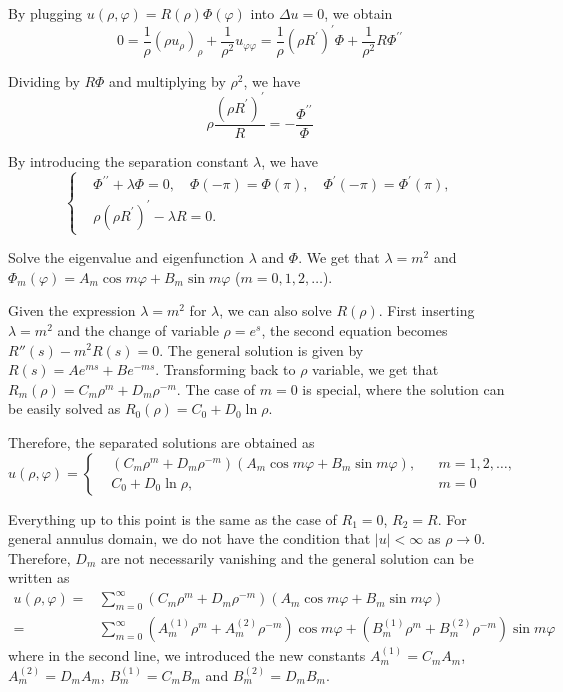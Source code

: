By plugging $u(\rho, \varphi)=R(\rho) \Phi(\varphi)$ into $\Delta u=0$, we obtain
$$
0=\frac{1}{\rho} ( \rho u_\rho)_\rho+\frac{1}{\rho^2} u_{\varphi \varphi}=\frac{1}{\rho}(\rho R^{\prime})^{\prime} \Phi+\frac{1}{\rho^2} R \Phi^{\prime \prime}
$$

Dividing by $R \Phi$ and multiplying by $\rho^2$, we have
$$
\rho \frac{(\rho R^{\prime})^{\prime}}{R} = - \frac{\Phi^{\prime \prime}}{\Phi}
$$


By introducing the separation constant $\lambda$, we have
\begin{equation}\label{eq.Laplace_separation_var_general}
\left\{\begin{aligned}
    &\Phi^{\prime \prime}+\lambda \Phi=0, \quad \Phi(-\pi)=\Phi(\pi), \quad \Phi^{\prime}(-\pi)=\Phi^{\prime}(\pi), 
    \\
    &\rho (\rho R^{\prime})^{\prime} - \lambda R = 0.
\end{aligned}
\right.
\end{equation}

Solve the eigenvalue and eigenfunction $\lambda$ and $\Phi$. We get that $\lambda=m^2$ and $\Phi_m(\varphi)=A_m \cos m \varphi+B_m \sin m \varphi$ ($m=0,1,2, \ldots$). 

Given the expression $\lambda=m^2$ for $\lambda$, we can also solve $R(\rho)$. First inserting $\lambda=m^2$ and the change of variable $\rho = e^s$, the second equation becomes $R''(s) - m^2 R(s) = 0$. The general solution is given by $R(s) = Ae^{ms} + Be^{-ms}$. Transforming back to $\rho$ variable, we get that $R_m(\rho) = C_m\rho^m + D_m\rho^{-m}$. The case of $m = 0$ is special, where the solution can be easily solved as $R_0(\rho) = C_0+D_0 \ln \rho$.

Therefore, the separated solutions are obtained as
\begin{equation}
u(\rho, \varphi)=\left\{
\begin{aligned}
    &\left(C_m\rho^m + D_m\rho^{-m}\right)\left(A_m \cos m \varphi+B_m \sin m \varphi\right), && m=1,2, \ldots, 
    \\
    &C_0+D_0 \ln \rho, && m=0 
\end{aligned}
\right.
\end{equation}


Everything up to this point is the same as the case of $R_1 = 0$, $R_2 = R$. For general annulus domain, we do not have the condition that $|u| < \infty$ as $\rho \rightarrow 0$. Therefore, $D_m$ are not necessarily vanishing and the general solution can be written as
$$
\begin{aligned}
    u(\rho, \varphi)=&\sum_{m = 0}^\infty\left(C_m\rho^m + D_m\rho^{-m}\right)\left(A_m \cos m \varphi+B_m \sin m \varphi\right)
    \\
    =& \sum_{m = 0}^\infty\left(A^{(1)}_m\rho^m + A^{(2)}_m\rho^{-m}\right)\cos m \varphi + \left(B^{(1)}_m\rho^m + B^{(2)}_m\rho^{-m}\right)\sin m \varphi
\end{aligned}
$$
where in the second line, we introduced the new constants $A^{(1)}_m = C_mA_m$, $A^{(2)}_m = D_mA_m$, $B^{(1)}_m = C_mB_m$ and $B^{(2)}_m = D_mB_m$.

